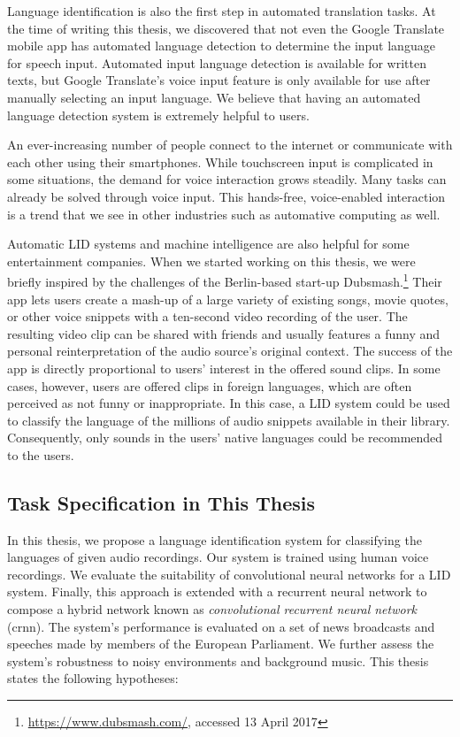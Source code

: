 Language identification is also the first step in automated translation tasks. At the time of writing this thesis, we discovered that not even the Google Translate mobile app has automated language detection to determine the input language for speech input. Automated input language detection is available for written texts, but Google Translate's voice input feature is only available for use after manually selecting an input language. We believe that having an automated language detection system is extremely helpful to users.

An ever-increasing number of people connect to the internet or communicate with each other using their smartphones. While touchscreen input is complicated in some situations, the demand for voice interaction grows steadily. Many tasks can already be solved through voice input. This hands-free, voice-enabled interaction is a trend that we see in other industries such as automative computing as well.

Automatic LID systems and machine intelligence are also helpful for some entertainment companies. When we started working on this thesis, we were briefly inspired by the challenges of the Berlin-based start-up Dubsmash.\footnote{\url{https://www.dubsmash.com/}, accessed 13 April 2017} Their app lets users create a mash-up of a large variety of existing songs, movie quotes, or other voice snippets with a ten-second video recording of the user. The resulting video clip can be shared with friends and usually features a funny and personal reinterpretation of the audio source's original context. The success of the app is directly proportional to users' interest in the offered sound clips. In some cases, however, users are offered clips in foreign languages, which are often perceived as not funny or inappropriate. In this case, a LID system could be used to classify the language of the millions of audio snippets available in their library. Consequently, only sounds in the users' native languages could be recommended to the users.


\subsection{Task Specification in This Thesis}
In this thesis, we propose a language identification system for classifying the languages of given audio recordings. Our system is trained using human voice recordings. We evaluate the suitability of convolutional neural networks for a LID system. Finally, this approach is extended with a recurrent neural network to compose a hybrid network known as \emph{convolutional recurrent neural network} (\ac{crnn}). The system's performance is evaluated on a set of news broadcasts and speeches made by members of the European Parliament. We further assess the system's robustness to noisy environments and background music. This thesis states the following hypotheses:

